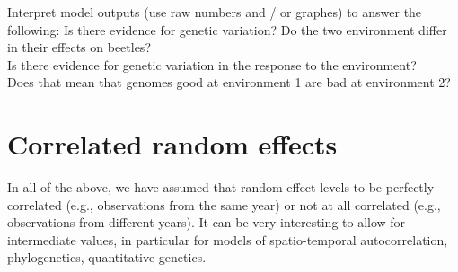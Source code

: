 \documentclass[12pt,a4paper]{scrartcl}\usepackage[]{graphicx}\usepackage[]{color}
\begin{document}
\begin{Exercise}[difficulty=3, title={Beetles: interpret}]
Interpret model outputs (use raw numbers and / or graphes) to answer the following:
Is there evidence for genetic variation? Do the two environment differ in their effects on beetles? \\
Is there evidence for genetic variation in the response to the environment? \\
Does that mean that genomes good at environment 1 are bad at environment 2?
\end{Exercise}

\section{Correlated random effects}
In all of the above, we have assumed that random effect levels to be perfectly correlated (e.g., observations from the same year) or not at all correlated (e.g., observations from different years). It can be very interesting to allow for intermediate values, in particular for models of spatio-temporal autocorrelation, phylogenetics, quantitative genetics.
\end{document}
